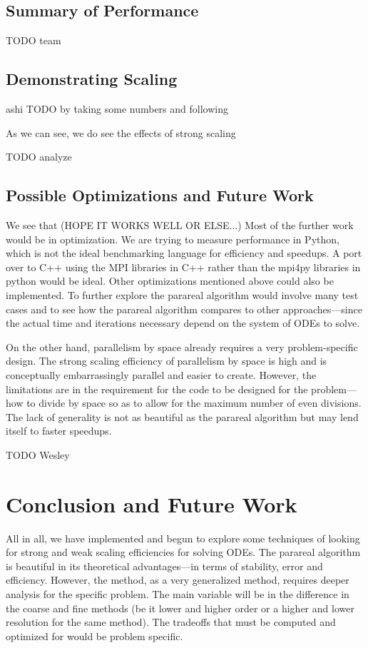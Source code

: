 \documentclass[letterpaper,12pt]{article}
\begin{document}
\subsection{Summary of Performance}

TODO team

\subsection{Demonstrating Scaling}

ashi TODO by taking some numbers and following

As we can see, we do see the effects of strong scaling

TODO analyze

\subsection{Possible Optimizations and Future Work}

We see that (HOPE IT WORKS WELL OR ELSE...) Most of the further work would be in
optimization. We are trying to measure performance in Python, which is not the
ideal benchmarking language for efficiency and speedups. A port over to C++
using the MPI libraries in C++ rather than the mpi4py libraries in python would
be ideal. Other optimizations mentioned above could also be implemented. To
further explore the parareal algorithm would involve many test cases and to see
how the parareal algorithm compares to other approaches---since the actual time
and iterations necessary depend on the system of ODEs to solve.

On the other hand, parallelism by space already requires a very problem-specific
design. The strong scaling efficiency of parallelism by space is high and is
conceptually embarrassingly parallel and easier to create. However, the
limitations are in the requirement for the code to be designed for the
problem---how to divide by space so as to allow for the maximum number of even
divisions. The lack of generality is not as beautiful as the parareal algorithm
but may lend itself to faster speedups.

TODO Wesley

\section{Conclusion and Future Work}


All in all, we have implemented and begun to explore some techniques of looking
for strong and weak scaling efficiencies for solving ODEs. The parareal
algorithm is beautiful in its theoretical advantages---in terms of stability,
error and efficiency. However, the method, as a very generalized method,
requires deeper analysis for the specific problem. The main variable will be in
the difference in the coarse and fine methods (be it lower and higher order or a
higher and lower resolution for the same method). The tradeoffs that must be
computed and optimized for would be problem specific.
\end{document}
